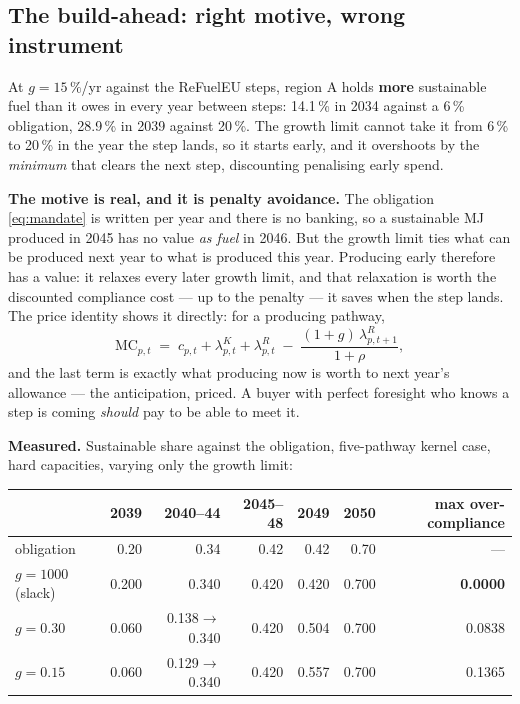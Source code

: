 \documentclass[11pt,a4paper]{article}
\begin{document}
\subsection{The build-ahead: right motive, wrong instrument}
\label{sec:foresight}

At $g = 15\,\%$/yr against the ReFuelEU steps, region A holds \textbf{more} sustainable
fuel than it owes in every year between steps: 14.1\,\% in 2034 against a 6\,\%
obligation, 28.9\,\% in 2039 against 20\,\%. The growth limit cannot take it from 6\,\% to
20\,\% in the year the step lands, so it starts early, and it overshoots by the
\emph{minimum} that clears the next step, discounting penalising early spend.

\begin{keybox}
\textbf{The motive is real, and it is penalty avoidance.} The obligation
\eqref{eq:mandate} is written per year and there is no banking, so a sustainable MJ
produced in 2045 has no value \emph{as fuel} in 2046. But the growth limit ties what can be
produced next year to what is produced this year. Producing early therefore has a value:
it relaxes every later growth limit, and that relaxation is worth the discounted
compliance cost --- up to the penalty --- it saves when the step lands. The price
identity shows it directly: for a producing pathway,
\[
  \mathrm{MC}_{p,t} \;=\; c_{p,t} + \lambda^{K}_{p,t} + \lambda^{R}_{p,t}
  \;-\; \frac{(1+g)\,\lambda^{R}_{p,t+1}}{1+\rho},
\]
and the last term is exactly what producing now is worth to next year's allowance --- the
anticipation, priced. A buyer with perfect foresight who knows a step is coming
\emph{should} pay to be able to meet it.

\medskip
\textbf{Measured.} Sustainable share against the obligation, five-pathway kernel case,
hard capacities, varying only the growth limit:

\medskip
\begin{center}\small
\begin{tabular}{@{}lrrrrrr@{}}
\toprule
& \textbf{2039} & \textbf{2040--44} & \textbf{2045--48} & \textbf{2049} & \textbf{2050}
& \textbf{max over-compliance} \\
\midrule
obligation & 0.20 & 0.34 & 0.42 & 0.42 & 0.70 & --- \\
$g = 1000$ (slack) & 0.200 & 0.340 & 0.420 & 0.420 & 0.700 & \textbf{0.0000} \\
$g = 0.30$ & 0.060 & 0.138$\to$0.340 & 0.420 & 0.504 & 0.700 & 0.0838 \\
$g = 0.15$ & 0.060 & 0.129$\to$0.340 & 0.420 & 0.557 & 0.700 & 0.1365 \\
\bottomrule
\end{tabular}
\end{center}
\medskip


\end{keybox}
\end{document}
